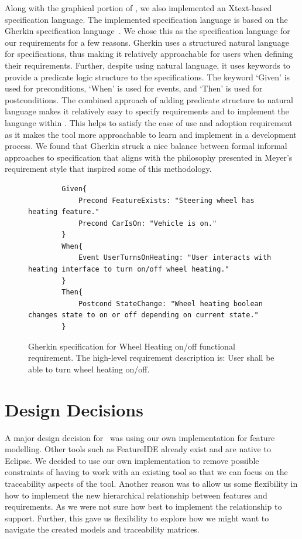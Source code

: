 Along with the graphical portion of \tool, we also implemented an Xtext-based~\cite{eysholdt2010xtext} specification language. The implemented specification language is based on the Gherkin specification language~\cite{nicieja2017writing, cucumberdocs}. We chose this as the specification language for our requirements for a few reasons. Gherkin uses a structured natural language for specifications, thus making it relatively approachable for users when defining their requirements. Further, despite using natural language, it uses keywords to provide a predicate logic structure to the specifications. The keyword `Given' is used for preconditions, `When' is used for events, and `Then' is used for postconditions. The combined approach of adding predicate structure to natural language makes it relatively easy to specify requirements and to implement the language within \tool. This helps to satisfy the ease of use and adoption requirement as it makes the tool more approachable to learn and implement in a development process. We found that Gherkin struck a nice balance between formal informal approaches to specification that aligns with the philosophy presented in Meyer's requirement style that inspired some of this methodology.

\begin{figure}
	\begin{lstlisting}
		Given{
			Precond FeatureExists: "Steering wheel has heating feature."
			Precond CarIsOn: "Vehicle is on."
		}
		When{
			Event UserTurnsOnHeating: "User interacts with heating interface to turn on/off wheel heating."
		}
		Then{
			Postcond StateChange: "Wheel heating boolean changes state to on or off depending on current state."
		}
	\end{lstlisting}
	\caption{Gherkin specification for Wheel Heating on/off functional requirement. The high-level requirement description is: User shall be able to turn wheel heating on/off.}
	\label{fig:specification}
\end{figure}

\section{Design Decisions}

A major design decision for \tool\ was using our own implementation for feature modelling. Other tools such as FeatureIDE already exist and are native to Eclipse. We decided to use our own implementation to remove possible constraints of having to work with an existing tool so that we can focus on the traceability aspects of the tool. Another reason was to allow us some flexibility in how to implement the new hierarchical relationship between features and requirements. As we were not sure how best to implement the relationship to support. Further, this gave us flexibility to explore how we might want to navigate the created models and traceability matrices. 


